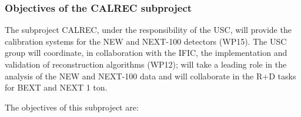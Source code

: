 %
%

\subsubsection*{Objectives of the CALREC subproject}

The subproject CALREC, under the responsibility of the USC, will provide the calibration systems for the NEW and NEXT-100 detectors (WP15).
The USC group will coordinate, in collaboration with the IFIC, the implementation and validation of reconstruction algorithms (WP12); will take a leading role in the analysis of the NEW and NEXT-100 data and will collaborate  in the R+D tasks for BEXT and NEXT 1 ton. 

The objectives of this subproject are:

